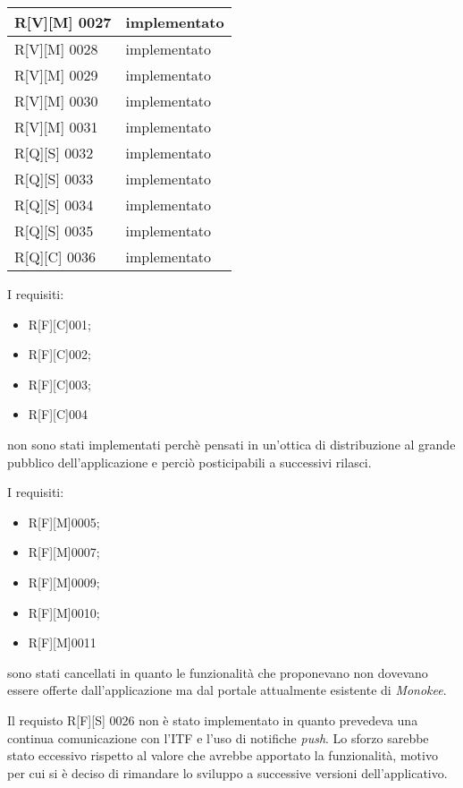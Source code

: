\begin{center}
\begin{longtable}{|p{3cm}|p{3cm}|}
    \hline
    R[V][M] 0027    & implementato  \\
    \hline
    R[V][M] 0028    & implementato  \\
    \hline
    R[V][M] 0029    & implementato  \\
    \hline
    R[V][M] 0030    & implementato  \\
    \hline
    R[V][M] 0031    & implementato  \\
    \hline
    R[Q][S] 0032    & implementato  \\
    \hline
    R[Q][S] 0033    & implementato  \\
    \hline
    R[Q][S] 0034    & implementato  \\
    \hline
    R[Q][S] 0035    & implementato  \\
    \hline
    R[Q][C] 0036    & implementato  \\
    \hline
    \end{longtable}
    \end{center}

I requisiti:
\begin{itemize}
    \item R[F][C]001;
    \item R[F][C]002;
    \item R[F][C]003;
    \item R[F][C]004
\end{itemize}
non sono stati implementati perchè pensati in un'ottica di distribuzione al grande pubblico dell'applicazione e perciò posticipabili a successivi rilasci.

I requisiti: 
\begin{itemize}
    \item R[F][M]0005; 
    \item R[F][M]0007; 
    \item R[F][M]0009; 
    \item R[F][M]0010; 
    \item R[F][M]0011 
\end{itemize}
sono stati cancellati in quanto le funzionalità che proponevano non dovevano essere offerte dall'applicazione ma dal portale attualmente esistente di \emph{Monokee}.

Il requisto R[F][S] 0026 non è stato implementato in quanto prevedeva una continua comunicazione con l'ITF e l'uso di notifiche \emph{push}. Lo sforzo sarebbe stato eccessivo rispetto al valore che avrebbe apportato la funzionalità, motivo per cui si è deciso di rimandare lo sviluppo a successive versioni dell'applicativo.

